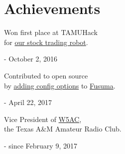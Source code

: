 \documentclass{article}
\begin{document}
\section{Achievements}

\noindent
\begin{minipage}[t]{0.33\textwidth}
Won first place at TAMUHack \\
for \href{https://devpost.com/software/midas-evi574}{our stock trading robot}.

\hfill - October 2, 2016
\end{minipage}\hfill
\begin{minipage}[t]{0.33\textwidth}
Contributed to open source \\
by \href{https://github.com/iberianpig/fusuma/pull/36}{adding config options} to \href{https://github.com/iberianpig/fusuma}{Fusuma}.

\hfill - April 22, 2017
\end{minipage}\hfill
\begin{minipage}[t]{0.33\textwidth}
Vice President of \href{http://w5ac.tamu.edu}{W5AC},  \\
the Texas A\&M Amateur Radio Club.

\hfill - since February 9, 2017
\end{minipage}

\end{document}
